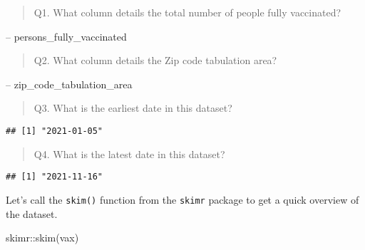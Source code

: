 \documentclass[
]{article}
\newenvironment{Shaded}{\begin{snugshade}}{\end{snugshade}}
\newcommand{\DecValTok}[1]{\textcolor[rgb]{0.00,0.00,0.81}{#1}}
\newcommand{\FunctionTok}[1]{\textcolor[rgb]{0.00,0.00,0.00}{#1}}
\newcommand{\NormalTok}[1]{#1}
\newcommand{\SpecialCharTok}[1]{\textcolor[rgb]{0.00,0.00,0.00}{#1}}
\begin{document}
\begin{quote}
Q1. What column details the total number of people fully vaccinated?
\end{quote}

-- persons\_fully\_vaccinated

\begin{quote}
Q2. What column details the Zip code tabulation area?
\end{quote}

-- zip\_code\_tabulation\_area

\begin{quote}
Q3. What is the earliest date in this dataset?
\end{quote}

\begin{Shaded}
\end{Shaded}

\begin{verbatim}
## [1] "2021-01-05"
\end{verbatim}

\begin{quote}
Q4. What is the latest date in this dataset?
\end{quote}

\begin{Shaded}
\end{Shaded}

\begin{verbatim}
## [1] "2021-11-16"
\end{verbatim}

Let's call the \texttt{skim()} function from the \texttt{skimr} package
to get a quick overview of the dataset.

\begin{Shaded}
\begin{Highlighting}[]
\NormalTok{skimr}\SpecialCharTok{::}\FunctionTok{skim}\NormalTok{(vax)}
\end{Highlighting}
\end{Shaded}
\end{document}
